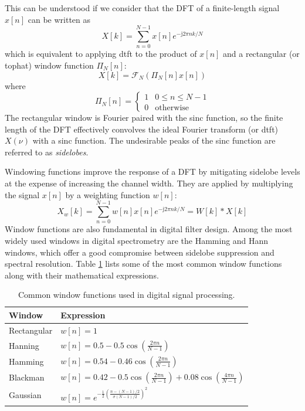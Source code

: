 This can be understood if we consider that the DFT of a finite-length signal $x[n]$ can be written as
\begin{equation}
	X[k] = \sum_{n=0}^{N-1} x[n] e^{-\mathrm{j} 2\pi n k / N}
\end{equation}
which is equivalent to applying \gls{dtft} to the product of $x[n]$ and a rectangular (or tophat) window function $\Pi_N[n]$:
\begin{equation}
	X[k] = \mathcal{F}_N \left( \Pi_N[n] x[n] \right)
\end{equation}
where
\begin{equation}
	\Pi_N[n] =
	\begin{cases}
		1 & 0 \leq n \leq N-1 \\
		0 & \text{otherwise}
	\end{cases}
\end{equation}
The rectangular window is Fourier paired with the sinc function, so the finite length of the DFT effectively convolves the ideal Fourier transform (or \gls{dtft}) $X(\nu)$ with a sinc function. The undesirable peaks of the sinc function are referred to as \emph{sidelobes}.

Windowing functions improve the response of a DFT by mitigating sidelobe levels at the expense of increasing the channel width. They are applied by multiplying the signal $x[n]$ by a weighting function $w[n]$:
\begin{equation}
	X_w[k] = \sum_{n=0}^{N-1} w[n] x[n] e^{-\mathrm{j} 2\pi n k / N} = W[k] * X[k]
\end{equation}
Window functions are also fundamental in digital filter design. Among the most widely used windows in digital spectrometry are the Hamming and Hann windows, which offer a good compromise between sidelobe suppression and spectral resolution. Table \ref{tab:window_functions} lists some of the most common window functions along with their mathematical expressions. 

\begin{table}[h!]
	\centering
	\begin{tabular}{ll}
		\toprule
		\textbf{Window} & \textbf{Expression} \\
		\midrule
		Rectangular & $w[n] = 1$ \\
		Hanning & $w[n] = 0.5 - 0.5 \cos\left(\frac{2\pi n}{N-1}\right)$ \\
		Hamming & $w[n] = 0.54 - 0.46 \cos\left(\frac{2\pi n}{N-1}\right)$ \\
		Blackman & $w[n] = 0.42 - 0.5 \cos\left(\frac{2\pi n}{N-1}\right) + 0.08 \cos\left(\frac{4\pi n}{N-1}\right)$ \\
		Gaussian & $w[n] = e^{-\frac{1}{2} \left(\frac{n - (N-1)/2}{\sigma (N-1)/2}\right)^2}$ \\
	\end{tabular}
	\label{tab:window_functions}
	\caption{Common window functions used in digital signal processing.}
\end{table}




